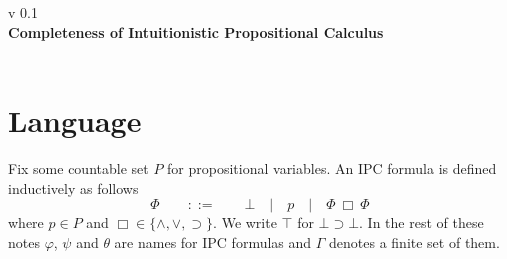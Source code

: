 \documentclass[a4paper,12pt]{paper}
\begin{document}
{\noindent
	v 0.1 \\
{\large\textbf{Completeness of Intuitionistic Propositional Calculus}} \\
}
\\
\setcounter{section}{-1}
\section{Language} Fix some countable set $P$ for propositional variables. An IPC formula is defined inductively as follows
\[ \Phi \qquad::=\qquad \bot \quad|\quad p \quad|\quad \Phi ~\Box~ \Phi \]
where $p \in P$ and $\Box \in \{ \land , \lor , \supset \}$. We write $\top$ for $\bot \supset \bot$.
In the rest of these notes $\varphi$, $\psi$ and $\theta$ are names for IPC formulas and $\Gamma$ denotes a finite set of them.
\end{document}
